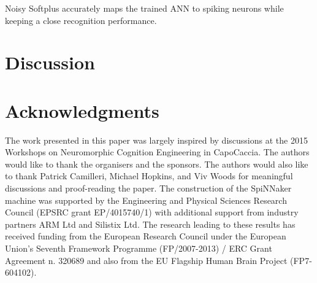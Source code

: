 \documentclass[runningheads,a4paper]{llncs}
\begin{document}
Noisy Softplus accurately maps the trained ANN to spiking neurons while keeping a close recognition performance.
\section{Discussion}

\section*{Acknowledgments}

The work presented in this paper was largely inspired by discussions at the 2015 Workshops on Neuromorphic Cognition Engineering in CapoCaccia.
The authors would like to thank the organisers and the sponsors.
The authors would also like to thank Patrick Camilleri, Michael Hopkins, and Viv Woods for meaningful discussions and proof-reading the paper.
The construction of the SpiNNaker machine was supported by the Engineering and Physical Sciences Research Council (EPSRC grant EP/4015740/1) with additional support from industry partners ARM Ltd and Silistix Ltd.
The research leading to these results has received funding from the European Research Council under the European Union's Seventh Framework Programme (FP/2007-2013) / ERC Grant Agreement n. 320689 and also from the EU Flagship Human Brain Project (FP7-604102). 
\end{document}
